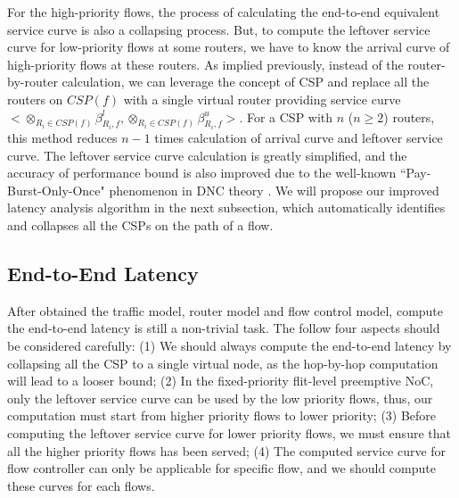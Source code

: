 \documentclass[10pt,journal]{IEEEtran}
\begin{document}
For the high-priority flows, the process of calculating the end-to-end equivalent service curve is also a collapsing process. But, to compute the leftover service curve for low-priority flows at some routers, we have to know the arrival curve of high-priority flows at these routers. As implied previously, instead of the router-by-router calculation, we can leverage the concept of CSP and replace all the routers on $CSP(f)$ with a single virtual router providing service curve $<\otimes_{R_i\in CSP(f)}\beta_{R_i,f}^l,\otimes_{R_i\in CSP(f)}\beta_{R_i,f}^u>$. For a CSP with $n$ ($n\geq 2$) routers, this method reduces $n-1$ times calculation of arrival curve and leftover service curve. The leftover service curve calculation is greatly simplified, and the accuracy of performance bound is also improved due to the well-known ``Pay-Burst-Only-Once" phenomenon in DNC theory \cite{Boudec2001Network}. We will propose our improved latency analysis algorithm in the next subsection, which automatically identifies and collapses all the CSPs on the path of a flow.
 
\subsection{End-to-End Latency}\label{e2elatency}
After obtained the traffic model, router model and flow control model, compute the end-to-end latency is still a non-trivial task. The follow four aspects should be considered carefully: (1) We should always compute the end-to-end latency by collapsing all the CSP to a single virtual node, as the hop-by-hop computation will lead to a looser bound; (2) In the fixed-priority flit-level preemptive NoC, only the leftover service curve can be used by the low priority flows, thus, our computation must start from higher priority flows to lower priority; (3) Before computing the leftover service curve for lower priority flows, we must ensure that all the higher priority flows has been served; (4) The computed service curve for flow controller can only be applicable for specific flow, and we should compute these curves for each flows.
\end{document}
